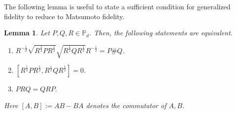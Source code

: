 \documentclass[12pt]{article}
\newtheorem{lemma}[theorem]{Lemma}     %
\theoremstyle{definition}
\begin{document}
The following lemma is useful to state a sufficient condition for generalized fidelity to reduce to Matsumoto fidelity.

\begin{theorembox}
    \begin{lemma} \label{Lem:GenFidMatFidSuffCondition}
Let $P,Q,R \in \mathbb{P}_d$. Then, the following statements are equivalent.
\begin{enumerate}
    \item $R^{-\frac 12} \sqrt{R^{\frac 12} P R^{\frac 12}} \sqrt{R^{\frac 12} Q R^{\frac 12}} R^{-\frac 12} = P \# Q.$
    \item $\left[R ^{\frac 12} P R ^{\frac 12}, R ^{\frac 12} Q R ^{\frac 12}\right]  = 0.$
    \item $ P R Q = Q R P.$

\end{enumerate}
Here $[A,B] := AB - BA$ denotes the commutator of $A,B$.
\end{lemma}
\end{theorembox}
\end{document}

